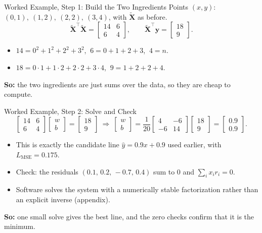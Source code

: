 \documentclass{ntuabeamer}
\newcommand{\takeaway}[1]{\par\vspace{0.3cm}\begingroup\raggedright\noindent
  {\color{courseblue}\textbf{So:}} #1\par\endgroup}
\begin{document}
\begin{frame}{Worked Example, Step 1: Build the Two Ingredients}
  Points $(x,y)$: $(0,1),\ (1,2),\ (2,2),\ (3,4)$, with $\widetilde{\mathbf X}$ as before.
  \[
    \widetilde{\mathbf X}^\top\widetilde{\mathbf X}=\begin{bmatrix}14&6\\6&4\end{bmatrix},
    \qquad
    \widetilde{\mathbf X}^\top\mathbf y=\begin{bmatrix}18\\9\end{bmatrix}.
  \]
  \begin{itemize}
    \item $14=0^2+1^2+2^2+3^2$, $\ 6=0+1+2+3$, $\ 4=n$.
    \item $18=0\cdot1+1\cdot2+2\cdot2+3\cdot4$, $\ 9=1+2+2+4$.
  \end{itemize}
  \takeaway{the two ingredients are just sums over the data, so they are cheap to compute.}
\end{frame}

\begin{frame}{Worked Example, Step 2: Solve and Check}
  \[
    \begin{bmatrix}14&6\\6&4\end{bmatrix}\begin{bmatrix}w\\b\end{bmatrix}=\begin{bmatrix}18\\9\end{bmatrix}
    \ \Longrightarrow\
    \begin{bmatrix}w\\b\end{bmatrix}=\frac1{20}\begin{bmatrix}4&-6\\-6&14\end{bmatrix}\begin{bmatrix}18\\9\end{bmatrix}
    =\begin{bmatrix}0.9\\0.9\end{bmatrix}.
  \]
  \begin{itemize}
    \item This is exactly the candidate line $\hat y=0.9x+0.9$ used earlier, with $L_{\mathrm{MSE}}=0.175$.
    \item Check: the residuals $(0.1,\,0.2,\,-0.7,\,0.4)$ sum to $0$ and $\sum_i x_ir_i=0$.
    \item Software solves the system with a numerically stable factorization rather than an explicit inverse (appendix).
  \end{itemize}
  \takeaway{one small solve gives the best line, and the zero checks confirm that it is the minimum.}
\end{frame}
\end{document}

